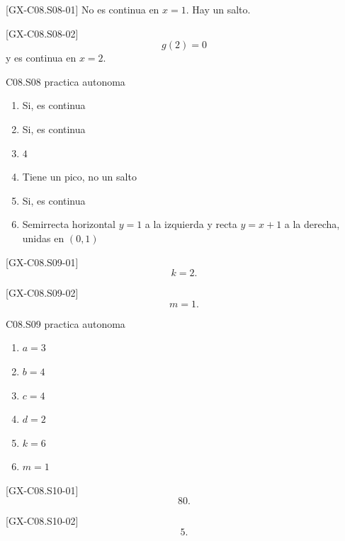 \begin{shortanswer}{[GX-C08.S08-01]}
No es continua en \(x=1\). Hay un salto.
\end{shortanswer}

\begin{shortanswer}{[GX-C08.S08-02]}
\[
g(2)=0
\]
y es continua en \(x=2\).
\end{shortanswer}

\begin{shortanswer}{C08.S08 practica autonoma}
\begin{enumerate}[label=\textbf{PX-C08.S08-\arabic*:}, leftmargin=*]
  \item Si, es continua
  \item Si, es continua
  \item \(4\)
  \item Tiene un pico, no un salto
  \item Si, es continua
  \item Semirrecta horizontal \(y=1\) a la izquierda y recta \(y=x+1\) a la derecha, unidas en \((0,1)\)
\end{enumerate}
\end{shortanswer}

\begin{shortanswer}{[GX-C08.S09-01]}
\[
k=2.
\]
\end{shortanswer}

\begin{shortanswer}{[GX-C08.S09-02]}
\[
m=1.
\]
\end{shortanswer}

\begin{shortanswer}{C08.S09 practica autonoma}
\begin{enumerate}[label=\textbf{PX-C08.S09-\arabic*:}, leftmargin=*]
  \item \(a=3\)
  \item \(b=4\)
  \item \(c=4\)
  \item \(d=2\)
  \item \(k=6\)
  \item \(m=1\)
\end{enumerate}
\end{shortanswer}

\begin{shortanswer}{[GX-C08.S10-01]}
\[
80.
\]
\end{shortanswer}

\begin{shortanswer}{[GX-C08.S10-02]}
\[
5.
\]
\end{shortanswer}

